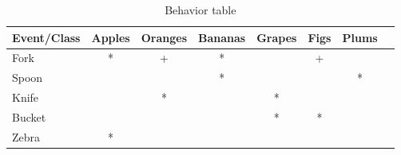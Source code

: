 % 
% 

\begin{table}[H]
    \centering
    \begin{tabular}{|l|c|c|c|c|c|c|c|}
    \hline
         Event/Class    & Apples   & Oranges  & Bananas & Grapes   & Figs    & Plums \\\hline
         Fork           &    *     &    +     &    *    &          &    +    &       \\\hline
         Spoon          &          &          &    *    &          &         &   *   \\\hline
         Knife          &          &    *     &         &    *     &         &       \\\hline
         Bucket         &          &          &         &    *     &    *    &       \\\hline
         Zebra          &    *     &          &         &          &         &       \\\hline
    \end{tabular}
    \caption{Behavior table}
    \label{tab:behavior_table}
\end{table}


